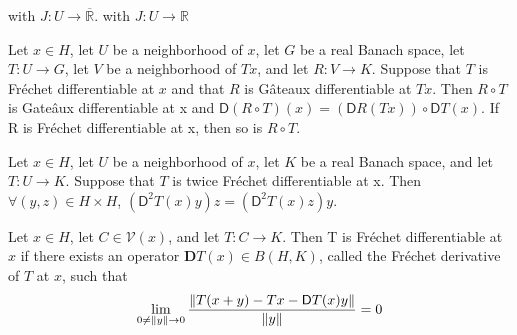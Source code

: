 with $J:U\rightarrow \overline{\mathbb{R}}$.
with $J:U\rightarrow \mathbb{R}$
\begin{fact}
	Let $x\in H$,  let $U$ be a neighborhood of $x$, let $G$ be a real Banach space, let $T:U\rightarrow G$, let $V$ be a neighborhood of $Tx$, and let $R : V \rightarrow K$.
	Suppose that $T$ is Fréchet differentiable at $x$ and that $R$ is Gâteaux differentiable at $Tx$. Then $R\circ T$ is Gate\^aux differentiable at x and $\mathsf{D}(R \circ T )(x) =
	(\mathsf{D}R(Tx))\circ \mathsf{D}T (x)$. If R is Fr\'echet differentiable at x, then so is $R \circ T $.
\end{fact}

\begin{fact}
	Let $x \in H$, let $U$ be a neighborhood of $x$, let $K$ be a real Banach
	space, and let $T: U \rightarrow K$. Suppose that $T$ is twice Fr\'echet differentiable at x.
	Then $\forall(y, z) \in H \times H$,  $(\mathsf{D}^2 T (x)y)z = (\mathsf{D}^2 T (x)z)y$.
\end{fact}

\begin{definition}
	Let $x \in H$, let $C \in \mathcal{V}(x)$, and let $T : C \rightarrow K$. Then T is
	Fr\'echet differentiable at $x$ if there exists an operator $\mathbf{D}T (x) \in B(H, K)$, called the Fréchet derivative of $T$ at $x$, such that
	\[
	\lim_{0\neq\left\lVert y\right\rVert\rightarrow 0}\frac{\left\lVert T(x+y)-Tx-\mathsf{D}T(x)y\right\rVert}{\left\lVert y\right\rVert}=0
	\]
\end{definition}

